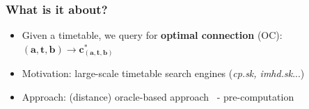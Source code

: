 \documentclass[]{beamer}
\newcommand{\inputTikZ}[1]{%
  }
\newcommand{\inputTikZ}[1]{%
    \beginpgfgraphicnamed{#1-external}%
    \endpgfgraphicnamed%
  }
\begin{document}
	    \begin{frame}
	        \frametitle{What is it about?}
	        \begin{itemize}
	        	\small
	            \item Given a timetable, we query for \textbf{optimal connection} (OC): $\bm{(a, t, b)} \rightarrow \bm{c_{(a, t, b)}^{*}}$
	        \end{itemize}
	        \vspace{-0.5cm}
	        \begin{figure}[h!]
				\scriptsize
                \begin{center}
					\inputTikZ{./tikzpics/connection}
                \end{center}
            \end{figure}
            \vspace{-0.5cm}	
            \begin{itemize}
            	\small
            	\item<2> Motivation: large-scale timetable search engines (\emph{cp.sk, imhd.sk}...)
				\item<2> Approach: (distance) oracle-based approach~\cite{apxdo05} - pre-computation
			\end{itemize}
			\vspace{-0.5cm}
			\uncover<2>{\begin{figure}[h!]
				\scriptsize
                \begin{center}
					\inputTikZ{./tikzpics/oracle}
                \end{center}
			\end{figure}}
	    \end{frame}
	    
\end{document}
